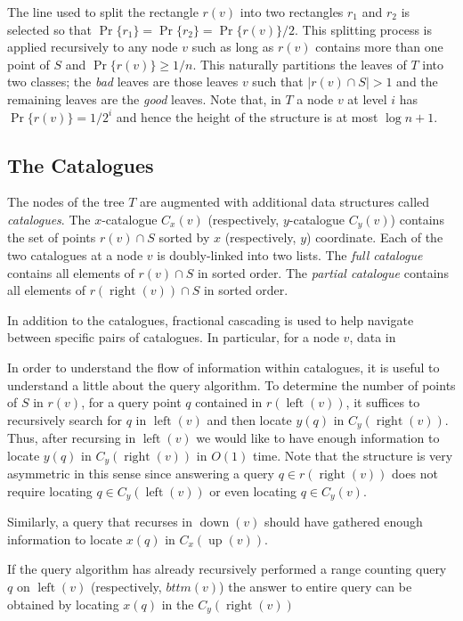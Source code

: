 \documentclass[lotsofwhite,charterfonts]{patmorin}
\DeclareMathOperator{\lft}{left}
\DeclareMathOperator{\rght}{right}
\DeclareMathOperator{\tp}{up}
\DeclareMathOperator{\bttm}{down}
\begin{document}
The line used to split the rectangle $r(v)$ into two rectangles $r_1$
and $r_2$ is selected so that $\Pr\{r_1\}=\Pr\{r_2\}=\Pr\{r(v)\}/2$.
This splitting process is applied recursively to any node $v$ such as
long as $r(v)$ contains more than one point of $S$ and $\Pr\{r(v)\}
\ge 1/n$.  This naturally partitions the leaves of $T$ into two
classes; the \emph{bad} leaves are those leaves $v$ such that
$|r(v)\cap S| > 1$ and the remaining leaves are the \emph{good}
leaves.  Note that, in $T$ a node $v$ at level $i$ has
$\Pr\{r(v)\}=1/2^i$ and hence the height of the structure is at most
$\log n+1$.


\subsection{The Catalogues}

The nodes of the tree $T$ are augmented with additional data
structures called \emph{catalogues}.  The $x$-catalogue $C_x(v)$
(respectively, $y$-catalogue $C_y(v)$) contains the set of points
$r(v)\cap S$ sorted by $x$ (respectively, $y$) coordinate.
Each of the two catalogues at a node $v$ is doubly-linked into two
lists.  The \emph{full catalogue} contains all elements of $r(v)\cap
S$ in sorted order. The \emph{partial catalogue} contains all elements
of $r(\rght(v))\cap S$ in sorted order.

In addition to the catalogues, fractional cascading \cite{X} is used
to help navigate between specific pairs of catalogues.  In particular,
for a node $v$, data in  


In order to
understand the flow of information within catalogues, it is useful to
understand a little about the query algorithm.  To determine the
number of points of $S$ in $r(v)$, for a query point $q$ contained in
$r(\lft(v))$, it suffices to recursively search for $q$ in $\lft(v)$
and then locate $y(q)$ in $C_y(\rght(v))$.  Thus, after recursing in
$\lft(v)$ we would like to have enough information to locate $y(q)$ in
$C_y(\rght(v))$ in $O(1)$ time.  Note that the structure is very
asymmetric in this sense since answering a query $q\in r(\rght(v))$
does not require locating $q\in C_y(\lft(v))$ or even locating $q\in
C_y(v)$.



Similarly, a query
that recurses in $\bttm(v)$ should have gathered enough information
to locate $x(q)$ in $C_x(\tp(v))$.


If the query algorithm
has already recursively performed a range counting query $q$ on $\lft(v)$
(respectively, $bttm(v)$) the answer to entire query can be obtained
by locating $x(q)$ in the $C_y(\rght(v))$
\end{document}
